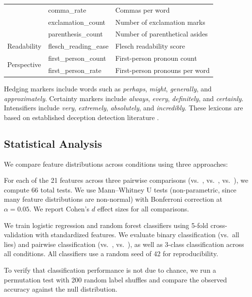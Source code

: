 \begin{table}[t]
\begin{tabular}{@{}llp{5.5cm}@{}}
         & comma\_rate & Commas per word \\
         & exclamation\_count & Number of exclamation marks \\
         & parenthesis\_count & Number of parenthetical asides \\
        \midrule
        Readability & flesch\_reading\_ease & Flesch readability score \\
        \midrule
        \multirow{2}{*}{Perspective} & first\_person\_count & First-person pronoun count \\
         & first\_person\_rate & First-person pronouns per word \\
        \bottomrule
    \end{tabular}
    \label{tab:features}
\end{table}

Hedging markers include words such as \emph{perhaps}, \emph{might}, \emph{generally}, and \emph{approximately}.
Certainty markers include \emph{always}, \emph{every}, \emph{definitely}, and \emph{certainly}.
Intensifiers include \emph{very}, \emph{extremely}, \emph{absolutely}, and \emph{incredibly}.
These lexicons are based on established deception detection literature \citep{newman2003lying}.

\subsection{Statistical Analysis}
\label{sec:stats}

We compare feature distributions across conditions using three approaches:

For each of the 21 features across three pairwise comparisons (\condtruth vs.\ \conddirect, \condtruth vs.\ \condrole, \conddirect vs.\ \condrole), we compute 66 total tests.
We use Mann--Whitney U tests (non-parametric, since many feature distributions are non-normal) with Bonferroni correction at $\alpha = 0.05$.
We report Cohen's $d$ effect sizes for all comparisons.

We train logistic regression and random forest classifiers using 5-fold cross-validation with standardized features.
We evaluate binary classification (\condtruth vs.\ all lies) and pairwise classification (\condtruth vs.\ \conddirect, \condtruth vs.\ \condrole), as well as 3-class classification across all conditions.
All classifiers use a random seed of 42 for reproducibility.

To verify that classification performance is not due to chance, we run a permutation test with 200 random label shuffles and compare the observed accuracy against the null distribution.
